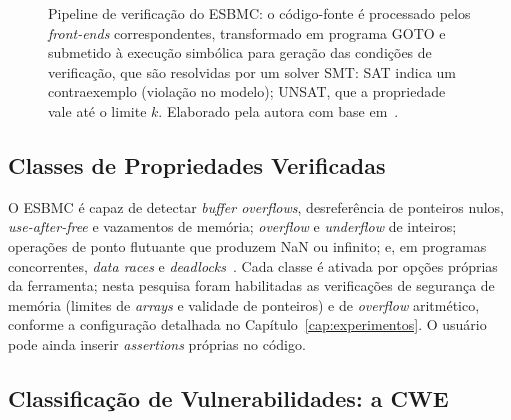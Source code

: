 \begin{figure}[ht]
{}
  \caption{Pipeline de verificação do ESBMC: o código-fonte é processado pelos
           \textit{front-ends} correspondentes, transformado em programa GOTO e submetido
           à execução simbólica para geração das condições de verificação, que
           são resolvidas por um solver SMT: SAT indica um contraexemplo
           (violação no modelo); UNSAT, que a propriedade vale até o limite $k$.
           Elaborado pela autora com base em~\cite{ESBMC_GitHub}.}
  \label{fig:esbmc_pipeline}
\end{figure}

\subsection{Classes de Propriedades Verificadas}

O ESBMC é capaz de detectar \textit{buffer overflows}, desreferência de ponteiros
nulos, \textit{use-after-free} e vazamentos de memória; \textit{overflow} e
\textit{underflow} de inteiros; operações de ponto flutuante que produzem NaN ou
infinito; e, em programas concorrentes, \textit{data races} e
\textit{deadlocks}~\cite{Menezes2024}. Cada classe é ativada por opções próprias
da ferramenta; nesta pesquisa foram habilitadas as verificações de segurança de
memória (limites de \textit{arrays} e validade de ponteiros) e de \textit{overflow}
aritmético, conforme a configuração detalhada no Capítulo~\ref{cap:experimentos}.
O usuário pode ainda inserir \textit{assertions} próprias no código.

\subsection{Classificação de Vulnerabilidades: a CWE}

